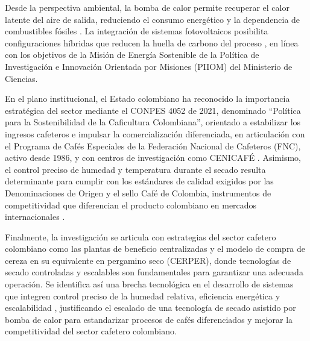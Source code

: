 Desde la perspectiva ambiental, la bomba de calor permite recuperar el calor latente 
del aire de salida, reduciendo el consumo energético y la dependencia de combustibles 
fósiles \parencite{fauzi_influence_2024, guevara-sanchez_effect_2019, 
cruz-ospina_improving_2026}. La integración de sistemas fotovoltaicos posibilita 
configuraciones híbridas que reducen la huella de carbono del proceso 
\parencite{prada_efectividad_2019}, en línea con los objetivos de la Misión de Energía 
Sostenible de la Política de Investigación e Innovación Orientada por Misiones (PIIOM) 
del Ministerio de Ciencias.

En el plano institucional, el Estado colombiano ha reconocido la importancia estratégica 
del sector mediante el CONPES 4052 de 2021, denominado ``Política para la Sostenibilidad 
de la Caficultura Colombiana'', orientado a estabilizar los ingresos cafeteros e impulsar 
la comercialización diferenciada, en articulación con 
el Programa de Cafés Especiales de la Federación Nacional de Cafeteros (FNC), activo 
desde 1986, y con centros de investigación como CENICAFÉ \parencite{tabarquino_munoz_cadena_2025}. 
Asimismo, el control preciso de humedad y temperatura durante el secado resulta 
determinante para cumplir con los estándares de calidad exigidos por las Denominaciones 
de Origen y el sello Café de Colombia, instrumentos de competitividad que diferencian 
el producto colombiano en mercados internacionales \parencite{tabarquino_munoz_cadena_2025, abreu_influence_2025, jakkaew_data-driven_2024}.

Finalmente, la investigación se articula con estrategias del sector cafetero colombiano 
como las plantas de beneficio centralizadas y el modelo de compra de cereza en su equivalente en pergamino seco (CERPER), donde tecnologías de 
secado controladas y escalables son fundamentales para garantizar una adecuada operación. Se identifica así una brecha 
tecnológica en el desarrollo de sistemas que integren control preciso de la humedad 
relativa, eficiencia energética y escalabilidad \parencite{khathir_drying_2024, 
konopatzki_coffee_2022, malik_microstructure_2020}, justificando el escalado de una 
tecnología de secado asistido por bomba de calor para estandarizar procesos de cafés 
diferenciados y mejorar la competitividad del sector cafetero colombiano.


